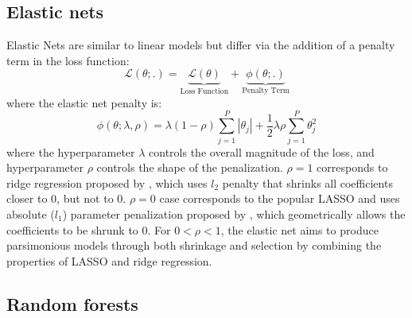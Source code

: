 \documentclass{article}
\begin{document}
\subsection{Elastic nets}
Elastic Nets are similar to linear models but differ via the addition of a penalty term in the loss function:
\begin{equation}
\mathcal{L(\theta;.)} = 
\underset{\text{Loss Function}}{\underbrace{\mathcal{L(\theta)}}} + 
\underset{\text{Penalty Term}}{\underbrace{\phi(\theta;.)}}
\end{equation}
where the elastic net penalty \cite{zou_regularization_2005} is:
\begin{equation}
\phi(\theta;\lambda,\rho) = 
\lambda(1-\rho) \sum_{j = 1}^{P}|\theta_j| +
\frac{1}{2} \lambda \rho \sum_{j = 1}^{P}\theta_j^2
\end{equation}
where the hyperparameter $\lambda$ controls the overall magnitude of the loss, and hyperparameter $\rho$ controls the shape of the penalization. $\rho = 1$ corresponds to ridge regression proposed by \cite{hoerl_ridge_1970}, which uses $l_2$ penalty that shrinks all coefficients closer to 0, but not to 0. $\rho = 0$ case corresponds to the popular LASSO and uses absolute ($l_1$) parameter penalization proposed by \cite{tibshirani_regression_1996}, which geometrically allows the coefficients to be shrunk to 0. For \(0 < \rho < 1\), the elastic net aims to produce parsimonious models through both shrinkage and selection by combining the properties of LASSO and ridge regression.

\subsection{Random forests}
\end{document}

